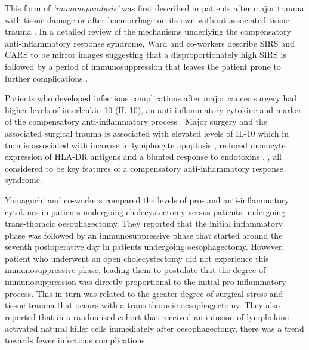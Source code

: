 This form of \textit{`immunoparalysis'} was first described in patients after major trauma with tissue damage \parencite{abraham_effects_1985,bandyopadhyay_negative_2007} or after haemorrhage on its own without associated tissue trauma \parencite{stephan_hemorrhage_1987}. 
In a detailed review of the mechanisms underlying the compensatory anti-inflammatory response syndrome, Ward and co-workers describe SIRS and CARS to be mirror images suggesting that a disproportionately high SIRS is followed by a period of immunosuppression that leaves the patient prone to further complications \parencite{ward_compensatory_2008}. 

Patients who developed infectious complications after major cancer surgery had higher levels of interleukin-10 (IL-10), an anti-inflammatory cytokine and marker of the compensatory anti-inflammatory process \parencite{mokart_early_2002}. 
Major surgery and the associated surgical trauma is associated with elevated levels of IL-10 which in turn is associated with increase in lymphocyte apoptosis \parencite{delogu_interleukin-10_2001}, reduced monocyte expression of HLA-DR antigens \parencite{klava_interleukin-10._1997} and a blunted response to endotoxins \parencite{ogata_role_2000, kawasaki_surgical_2001}. , all considered to be key features of a compensatory anti-inflammatory response syndrome. 

Yamaguchi and co-workers compared the levels of pro- and anti-inflammatory cytokines in patients undergoing cholecystectomy versus patients undergoing trans-thoracic oesophagectomy. 
They reported that the initial inflammatory phase was followed by an immunosuppressive phase that started around the seventh postoperative day in patients undergoing oesophagectomy. 
However, patient who underwent an open cholecystectomy did not experience this immunosuppressive phase, leading them to postulate that the degree of immunosuppression was directly proportional to the initial pro-inflammatory process. 
This in turn was related to the greater degree of surgical stress and tissue trauma that occurs with a trans-thoracic oesophagectomy. 
They also reported that in a randomised cohort that received an infusion of lymphokine-activated natural killer cells immediately after oesophagectomy, there was a trend towards fewer infectious complications \parencite{yamaguchi_postoperative_2006}. 

